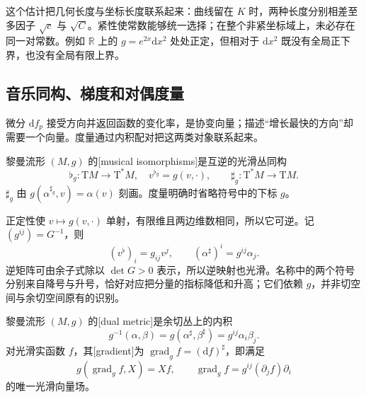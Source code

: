 这个估计把几何长度与坐标长度联系起来：曲线留在 \(K\) 时，两种长度分别相差至多因子 \(\sqrt c\) 与 \(\sqrt C\)。紧性使常数能够统一选择；在整个非紧坐标域上，未必存在同一对常数。例如 \(\mathbb R\) 上的 \(g=e^{2x}\mathrm{d}x^2\) 处处正定，但相对于 \(\mathrm{d}x^2\) 既没有全局正下界，也没有全局有限上界。

\subsection{音乐同构、梯度和对偶度量}
\label{g3:subsec:0101:02}

微分 \(\mathrm{d}f_p\) 接受方向并返回函数的变化率，是协变向量；描述“增长最快的方向”却需要一个向量。度量通过内积配对把这两类对象联系起来。

\begin{definition}
	\label{g3:def:musical-isomorphisms}
	黎曼流形 \((M,g)\) 的[musical isomorphisms]是互逆的光滑丛同构
	\[
		\flat_g:\mathrm{T}M\longrightarrow\mathrm{T}^*M,
		\quad v^{\flat_g}=g(v,\mathord\cdot),
		\qquad
		\sharp_g:\mathrm{T}^*M\longrightarrow\mathrm{T}M.
	\]
	\(\sharp_g\) 由 \(g(\alpha^{\sharp_g},v)=\alpha(v)\) 刻画。度量明确时省略符号中的下标 \(g\)。
\end{definition}

正定性使 \(v\mapsto g(v,\mathord\cdot)\) 单射，有限维且两边维数相同，所以它可逆。记 \((g^{ij})=G^{-1}\)，则
\begin{equation}
	\label{g3:eq:musical-coordinates}
	(v^\flat)_i=g_{ij}v^j,\qquad
	(\alpha^\sharp)^i=g^{ij}\alpha_j.
\end{equation}
逆矩阵可由余子式除以 \(\det G>0\) 表示，所以逆映射也光滑。名称中的两个符号分别来自降号与升号，恰好对应把分量的指标降低和升高；它们依赖 \(g\)，并非切空间与余切空间原有的识别。

\begin{definition}
	\label{g3:def:dual-metric-gradient}
	黎曼流形 \((M,g)\) 的[dual metric]是余切丛上的内积
	\[
		g^{-1}(\alpha,\beta)=g(\alpha^\sharp,\beta^\sharp)
		=g^{ij}\alpha_i\beta_j.
	\]
	对光滑实函数 \(f\)，其[gradient]为 \(\operatorname{grad}_g f=(\mathrm{d}f)^\sharp\)，即满足
	\begin{equation}
		\label{g3:eq:gradient-definition}
		g(\operatorname{grad}_g f,X)=Xf,\qquad
		\operatorname{grad}_g f=g^{ij}(\partial_jf)\partial_i
	\end{equation}
	的唯一光滑向量场。
\end{definition}

